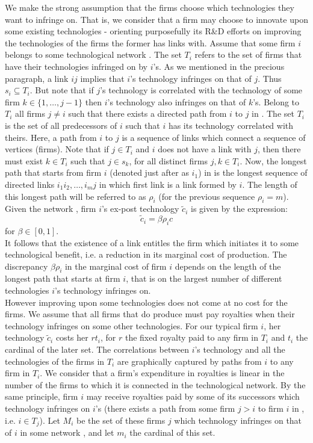 \documentclass{article}
\begin{document}
\indent We make the strong assumption that the firms choose which technologies they want to infringe on. That is, we consider that a firm may choose to innovate upon some existing technologies - orienting purposefully its R\&D efforts on improving the technologies of the firms the former has links with. Assume that some firm $i$ belongs to some technological network . The set $T_i$ refers to the set of firms that have their technologies infringed on by $i$'s. As we mentioned in the precious paragraph, a link $ij$ implies that $i$'s technology infringes on that of $j$. Thus $s_i\subseteq T_i$. But note that if $j$'s technology is correlated with the technology of some firm $k\in \{1,\ldots,j-1\}$ then $i$'s technology also infringes on that of $k$'s. Belong to $T_i$ all firms $j\neq i$ such that there exists a directed path from $i$ to $j$ in . The set $T_i$ is the set of all predecessors of $i$ such that $i$ has its technology correlated with theirs. Here, a path from $i$ to $j$ is a sequence of links which connect a sequence of vertices (firms). Note that if $j\in T_i$ and $i$ does not have a link with $j$, then there must exist $k\in T_i$ such that $j\in s_k$, for all distinct firms $j,k\in T_i$. Now, the longest path that starts from firm $i$ (denoted just after as $i_1$) in  is the longest sequence of directed links $ i_1i_2,\ldots , i_mj$ in  which first link is a link formed by $i$. The length of this longest path will be referred to as $\rho_i$ (for the previous sequence $\rho_i=m$). Given the network , firm $i$'s ex-post technology $\tilde{c}_i$ is given by the expression:
\begin{equation}
\tilde{c}_i=\beta \rho_ic
\end{equation}
for $\beta \in [0,1]$. \\
\indent It follows that the existence of a link entitles the firm which initiates it to some technological benefit, i.e. a reduction in its marginal cost of production. The discrepancy $\beta \rho_i$ in the marginal cost of firm $i$ depends on the length of the longest path that starts at firm $i$, that is on the largest number of different technologies $i$'s technology infringes on.\\
\indent However improving upon some technologies does not come at no cost for the firms. We assume that all firms that do produce must pay royalties when their technology infringes on some other technologies. For our typical firm $i$, her technology $\tilde{c}_i$ costs her $rt_i$, for $r$ the fixed royalty paid to any firm in $T_i$ and $t_i$ the cardinal of the later set. The correlations between $i$'s technology and all the technologies of the firms in $T_i$ are graphically captured by paths from $i$ to any firm in $T_i$. We consider that a firm's expenditure in royalties is linear in the number of the firms to which it is connected in the technological network. By the same principle, firm $i$ may receive royalties paid by some of its successors which technology infringes on $i$'s (there exists a path from some firm $j>i$ to firm $i$ in , i.e. $i\in T_j$). Let $M_i$ be the set of these firms $j$ which technology infringes on that of $i$ in some network , and let $m_i$ the cardinal of this set.\\
\end{document}
